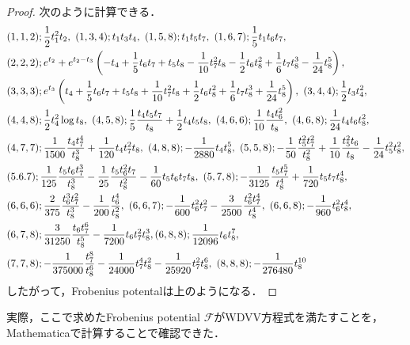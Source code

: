 \documentclass[a4paper,11pt]{jbook}
\theoremstyle{plain}
\theoremstyle{definition}
\theoremstyle{remark}
\theoremstyle{proof}
\numberwithin{equation}{section}
\def\F{{\mathcal F}}
\begin{document}
\begin{proof}
次のように計算できる． 
\begin{align*}
&(1,1,2) ; \dfrac{1}{2}t_1^2t_2, \ (1,3,4) ; t_1t_3t_4, \ (1,5,8) ; t_1t_5t_7, \ (1,6,7) ; \frac{1}{5}t_1t_6t_7, \notag \\
&(2,2,2);e^{t_2}+e^{t_2-t_3}\left(-t_4+\frac{1}{5}t_6t_7+t_5t_8-\frac{1}{10}t_7^2t_8-\frac{1}{2}t_6t_8^2+\frac{1}{6}t_7t_8^3-\frac{1}{24}t_8^5 \right), \notag \\
&(3,3,3) ; e^{t_3}\left(t_4+\frac{1}{5}t_6t_7+t_5t_8+\frac{1}{10}t_7^2t_8+\frac{1}{2}t_6t_8^2+\frac{1}{6}t_7t_8^3+\frac{1}{24}t_8^5 \right), \ (3,4,4) ; \dfrac{1}{2}t_3t_4^2, \ \notag \\
&(4,4,8) ; \dfrac{1}{2}t_4^2\log{t_8}, \ (4,5,8) ; \frac{1}{5}\frac{t_4t_5t_7}{t_8}+\frac{1}{2}t_4t_5t_8, \ (4,6,6) ; \frac{1}{10}\frac{t_4t_6^2}{t_8}, \ (4,6,8) ; \frac{1}{24}t_4t_6t_8^2, \notag \\
&(4,7,7) ; \frac{1}{1500}\frac{t_4t_7^4}{t_8^3}+\frac{1}{120}t_4t_7^2t_8, \ (4,8,8) ; -\frac{1}{2880}t_4t_8^5, \ (5,5,8) ; -\frac{1}{50}\frac{t_5^2t_7^2}{t_8^2}+\frac{1}{10}\frac{t_5^2t_6}{t_8}-\frac{1}{24}t_5^2t_8^2,  \notag \\
&(5.6.7) ; \frac{1}{125}\frac{t_5t_6t_7^3}{t_8^3}-\frac{1}{25}\frac{t_5t_6^2t_7}{t_8^2}-\frac{1}{60}t_5t_6t_7t_8, \ (5,7,8) ; -\frac{1}{3125}\frac{t_5t_7^5}{t_8^4}+\frac{1}{720}t_5t_7t_8^4, \ \notag \\
&(6,6,6) ; \frac{2}{375}\frac{t_6^3t_7^2}{t_8^3}-\frac{1}{200}\frac{t_6^4}{t_8^2}, \ (6,6,7) ; -\frac{1}{600}t_6^2t_7^2-\frac{3}{2500}\frac{t_6^2t_7^4}{t_8^4}, \ (6,6,8) ; -\frac{1}{960}t_6^2t_8^4, \  \notag \\
 &(6,7,8) ; \frac{3}{31250}\frac{t_6t_7^6}{t_8^5}-\frac{1}{7200}t_6t_7^2t_8^3, (6,8,8) ; \frac{1}{12096}t_6t_8^7,     \notag \\
&(7,7,8) ; -\frac{1}{375000}\frac{t_7^8}{t_8^6}-\frac{1}{24000}t_7^4t_8^2-\frac{1}{25920}t_7^2t_8^6, \ (8,8,8) ; -\frac{1}{276480}t_8^{10} 
\end{align*}
したがって，Frobenius potentalは上のようになる．
\end{proof}

実際，ここで求めたFrobenius potential $\F$がWDVV方程式を満たすことを，Mathematicaで計算することで確認できた．
\end{document}
